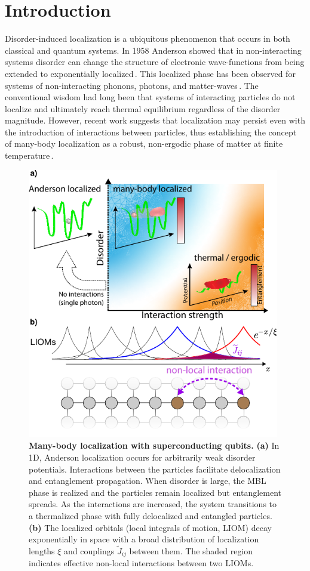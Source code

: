 \section{Introduction} %
Disorder-induced localization is a ubiquitous phenomenon that occurs in both classical and quantum systems. In 1958 Anderson showed that in non-interacting systems disorder can change the structure of electronic wave-functions from being extended to exponentially localized\,\cite{Anderson1958}. This localized phase has been observed for systems of non-interacting phonons, photons, and matter-waves\,\cite{The50years,Billy2008, Weaver1990, Wiersma1997, Schwartz2007}.  The conventional wisdom had long been that systems of interacting particles do not localize and ultimately reach thermal equilibrium regardless of the disorder magnitude. However, recent work suggests that localization may persist even with the introduction of interactions between particles, thus establishing the concept of many-body localization as a robust, non-ergodic phase of matter at finite temperature\,\cite{Basko2006, Gornyi2005, ImbriePRL2016}.

\begin{figure}[h!] %
\centering
\includegraphics[width=110mm]{./PDF/fig_1.pdf}
\caption{ \textbf{Many-body localization with superconducting qubits.} \textbf{(a)} In 1D, Anderson localization occurs for arbitrarily weak disorder potentials. Interactions between the particles facilitate delocalization and entanglement propagation. When disorder is large, the MBL phase is realized and the particles remain localized but entanglement spreads. As the interactions are increased, the system transitions to a thermalized phase with fully delocalized and entangled particles. \textbf{(b)} The localized orbitals (local integrals of motion, LIOM) decay exponentially in space with a broad distribution of localization lengths $\xi$ and couplings $\widetilde{J}_{ij}$ between them. The shaded region indicates effective non-local interactions between two LIOMs.}
\end{figure}


